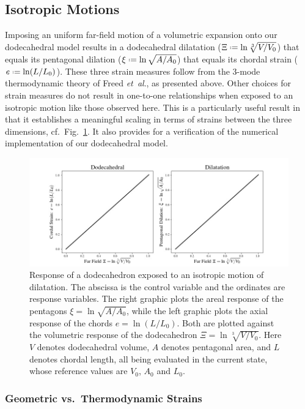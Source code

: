\subsection{Isotropic Motions}

Imposing an uniform far-field motion of a volumetric expansion onto our dodecahedral model results in a dodecahedral dilatation ($\Xi \defeq \ln \sqrt[3]{ V \! / V_0 }$) that equals its pentagonal dilation ($\xi \defeq \ln \sqrt{ A / A_0 }$) that equals its chordal strain ($e \defeq \ln ( L / L_0 )$).  These three strain measures follow from the 3-mode thermo\-dynamic theory of Freed \textit{et~al}., \cite{Freedetal17,FreedZamani19} as presented above.  Other choices for strain measures do not result in one-to-one relationships when exposed to an isotropic motion like those observed here.  This is a particularly useful result in that it establishes a meaningful scaling in terms of strains between the three dimensions, cf.\ Fig.~\ref{figDilatation}.  It also provides for a verification of the numerical implementation of our dodecahedral model.  

\begin{figure}
	\centering
	\includegraphics[width=\textwidth]{figures/dilatation.jpg}
	\caption{Response of a dodecahedron exposed to an isotropic motion of dilatation.  The abscissa is the control variable and the ordinates are response variables. The right graphic plots the areal response of the pentagons $\xi = \ln \sqrt{A / A_0}$, while the left graphic plots the axial response of the chords $e = \ln ( L / L_0)$. Both are plotted against the volumetric response of the dodecahedron $\Xi = \ln \sqrt[3]{V \! / V_0}$.  Here $V$ denotes dodecahedral volume, $A$ denotes pentagonal area, and $L$ denotes chordal length, all being evaluated in the current state, whose reference values are $V_0$, $A_0$ and $L_0$.}
	\label{figDilatation}
\end{figure}

\subsubsection{Geometric vs.\ Thermodynamic Strains}

